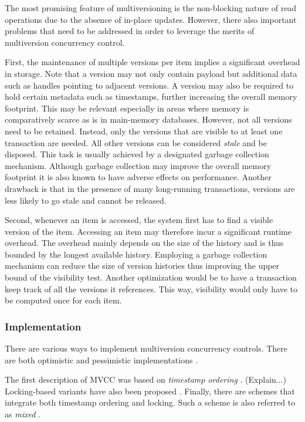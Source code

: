 The most promising feature of multiversioning is the non-blocking nature of read
operations due to the absence of in-place updates. However, there also important
problems that need to be addressed in order to leverage the merits of
multiversion concurrency control.

First, the maintenance of multiple versions per item implies a significant
overhead in storage. Note that a version may not only contain payload but
additional data such as handles pointing to adjacent versions. A version may
also be required to hold certain metadata such as timestamps, further increasing
the overall memory footprint. This may be relevant especially in areas where
memory is comparatively scarce as is in main-memory databases. However, not all
versions need to be retained. Instead, only the versions that are visible to at
least one transaction are needed. All other versions can be considered
\emph{stale} and be disposed. This task is usually achieved by a designated
garbage collection mechanism. Although garbage collection may improve the
overall memory footprint it is also known to have adverse effects on
performance. Another drawback is that in the presence of many long-running
transactions, versions are less likely to go stale and cannot be released.

Second, whenever an item is accessed, the system first has to find a visible
version of the item. Accessing an item may therefore incur a significant runtime
overhead. The overhead mainly depends on the size of the history and is thus
bounded by the longest available history. Employing a garbage collection
mechanism can reduce the size of version histories thus improving the upper
bound of the visibility test. Another optimization would be to have a
transaction keep track of all the versions it references. This way, visibility
would only have to be computed once for each item.

\subsubsection{Implementation}

There are various ways to implement multiversion concurrency controls. There are
both optimistic and pessimistic implementations \cite{kung1981optimistic}.

The first description of MVCC was based on \textit{timestamp ordering}
\cite{reed1978naming}. (Explain...) Locking-based variants have also been
proposed \cite{bayer1980parallelism, bayer1980distributed,
stearns1981distributed}. Finally, there are schemes that integrate both
timestamp ordering and locking. Such a scheme is also referred to as
\textit{mixed} \cite{bernstein1983multiversion}.

